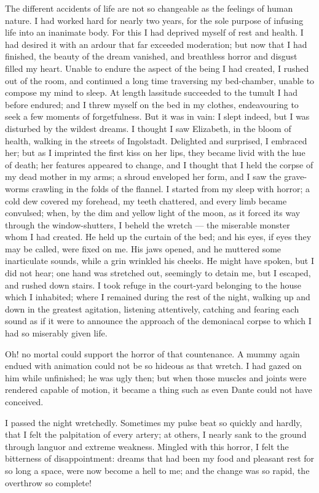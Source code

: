 The different accidents of life are
not so changeable as the feelings of
human nature. I had worked hard for
nearly two years, for the sole purpose of
infusing life into an inanimate body.
For this I had deprived myself of rest
and health. I had desired it with an
ardour that far exceeded moderation;
but now that I had finished, the beauty
of the dream vanished, and breathless
horror and disgust filled my heart.
Unable to endure the aspect of the
being I had created, I rushed out of
the room, and continued a long time
traversing my bed-chamber, unable to
compose my mind to sleep. At length
lassitude succeeded to the tumult I had
before endured; and I threw myself on
the bed in my clothes, endeavouring to
seek a few moments of forgetfulness.
But it was in vain: I slept indeed, but
I was disturbed by the wildest dreams.
I thought I saw Elizabeth, in the bloom
of health, walking in the streets of Ingolstadt.
Delighted and surprised, I embraced
her; but as I imprinted the first
kiss on her lips, they became livid with
the hue of death; her features appeared
to change, and I thought that I held
the corpse of my dead mother in my
arms; a shroud enveloped her form,
and I saw the grave-worms crawling in
the folds of the flannel. I started from
my sleep with horror; a cold dew covered
my forehead, my teeth chattered,
and every limb became convulsed;
when, by the dim and yellow light of
the moon, as it forced its way through
the window-shutters, I beheld the wretch --- the
miserable monster whom I had
created. He held up the curtain of the
bed; and his eyes, if eyes they may be
called, were fixed on me. His jaws
opened, and he muttered some inarticulate
sounds, while a grin wrinkled
his cheeks. He might have spoken,
but I did not hear; one hand was
stretched out, seemingly to detain me,
but I escaped, and rushed down stairs.
I took refuge in the court-yard belonging
to the house which I inhabited;
where I remained during the rest of the
night, walking up and down in the
greatest agitation, listening attentively,
catching and fearing each sound as if
it were to announce the approach of
the demoniacal corpse to which I had
so miserably given life.

Oh! no mortal could support the
horror of that countenance. A mummy
again endued with animation could
not be so hideous as that wretch. I
had gazed on him while unfinished;
he was ugly then; but when those muscles
and joints were rendered capable
of motion, it became a thing such as
even Dante could not have conceived.

I passed the night wretchedly. Sometimes
my pulse beat so quickly and
hardly, that I felt the palpitation of every
artery; at others, I nearly sank to the
ground through languor and extreme
weakness. Mingled with this horror, I felt
the bitterness of disappointment: dreams
that had been my food and pleasant rest
for so long a space, were now become a
hell to me; and the change was so rapid,
the overthrow so complete!

